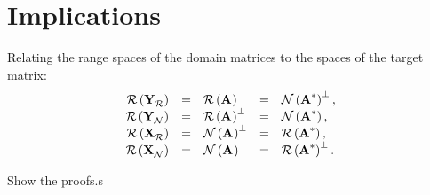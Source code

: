\section{Implications}
Relating the range spaces of the domain matrices to the spaces of the target matrix:
\begin{equation}
  \begin{array}{rclcl}
     \rng{\yrng} &=& \rng{\A{}} &=& \nll{\A{*}}^{\perp},\\
     \rng{\ynll} &=& \rng{\A{}}^{\perp} &=& \nll{\A{*}},\\
     \rng{\xrng} &=& \nll{\A{}}^{\perp} &=& \rng{\A{*}},\\
     \rng{\xnll} &=& \nll{\A{}} &=& \rng{\A{*}}^{\perp}.\\
  \end{array}
\end{equation}

Show the proofs.s

\endinput